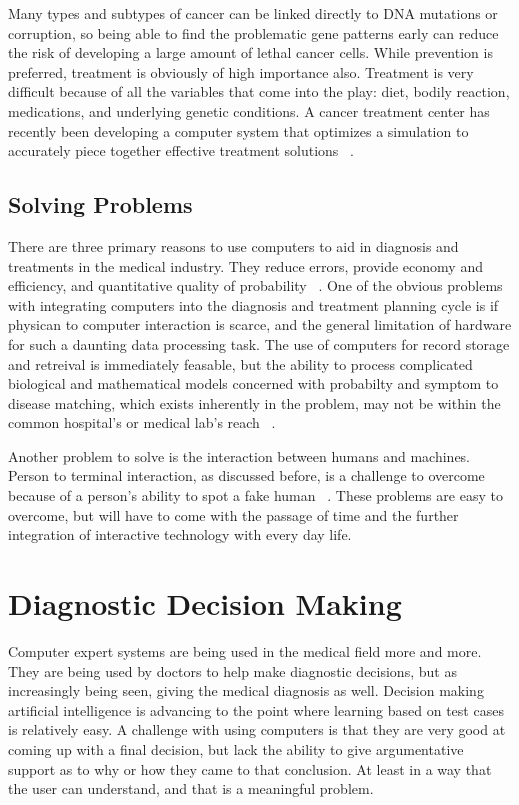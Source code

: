 \documentclass[11pt]{article}
\newcommand{\tab}{\hspace*{2em}}
\begin{document}
\begin{doublespace}
\tab Many types and subtypes of cancer can be linked directly to DNA mutations or corruption, so being able to find the
problematic gene patterns early can reduce the risk of developing a large amount of lethal cancer cells. While prevention
is preferred, treatment is obviously of high importance also. Treatment is very difficult because of all the variables that 
come into the play: diet, bodily reaction, medications, and underlying genetic conditions. A cancer treatment center has 
recently been developing a computer system that optimizes a simulation to accurately piece together effective treatment 
solutions ~\cite{Baesler:2001:HIM:564124.564329}. 

\subsection{Solving Problems}

\tab There are three primary reasons to use computers to aid in diagnosis and treatments in the medical industry. They reduce
errors, provide economy and efficiency, and quantitative quality of probability ~\cite{Yarnall:1966:CAM:800256.810706}. One of 
the obvious problems with integrating computers into the diagnosis and treatment planning cycle is if physican to computer
interaction is scarce, and the general limitation of hardware for such a daunting data processing task. The use of computers
for record storage and retreival is immediately feasable, but the ability to process complicated biological and mathematical
models concerned with probabilty and symptom to disease matching, which exists inherently in the problem, may not be within
the common hospital's or medical lab's reach ~\cite{Yarnall:1966:CAM:800256.810706}. 

\tab Another problem to solve is the interaction between humans and machines. Person to terminal interaction, as discussed 
before, is a challenge to overcome because of a person's ability to spot a fake human ~\cite{Barnett:1987:HDM:41526.41531}. 
These problems are easy to overcome, but will have to come with the passage of time and the further integration of interactive
technology with every day life.  

\section{Diagnostic Decision Making}

\tab Computer expert systems are being used in the medical field more and more. They are being used by doctors to help make diagnostic decisions, but as increasingly being seen, giving the medical diagnosis as well. Decision making artificial intelligence is advancing to the point where learning based on test cases is relatively easy. A challenge with using computers is that they are very good at coming up with a final decision, but lack the ability to give argumentative support as to why or how they came to that conclusion. At least in a way that the user can understand, and that is a meaningful problem.


\end{doublespace}
\end{document}
